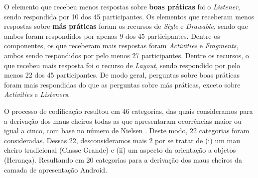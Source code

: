 O elemento que recebeu menos respostas sobre \textbf{\small boas práticas} foi o \textit{Listener}, sendo respondida por 10 dos 45 participantes. Os elementos que receberam menos respostas sobre \textbf{\small más práticas} foram os recursos de \textit{Style} e \textit{Drawable}, sendo que ambos foram respondidos por apenas 9 dos 45 participantes. Dentre os componentes, os que receberam mais respostas foram \textit{Activities} e \textit{Fragments}, ambos sendo respondidos por pelo menos 27 participantes. Dentre os recursos, o que recebeu mais resposta foi o recurso de \textit{Layout}, sendo respondido por pelo menos 22 dos 45 participantes. De modo geral, perguntas sobre boas práticas foram mais respondidas do que as perguntas sobre más práticas, exceto sobre \textit{Activities} e \textit{Listeners}.

O processo de codificação resultou em 46 categorias, das quais consideramos para a derivação dos maus cheiros todas as que apresentaram ocorrências maior ou igual a cinco, com base no número de Nielsen \cite{NielsenMagicNumber:00}. Deste modo, 22 categorias foram consideradas. Dessas 22, desconsideramos mais 2 por se tratar de (i) um mau cheiro tradicional (Classe Grande) e (ii) um aspecto da orientação a objetos (Herança). Resultando em 20 categorias para a derivação dos maus cheiros da camada de apresentação Android. 



